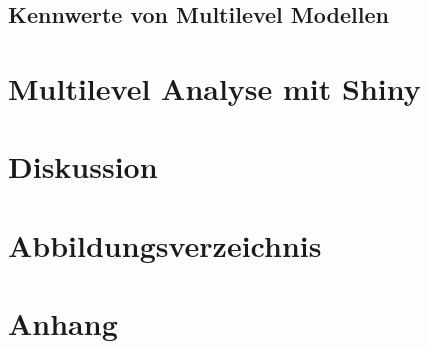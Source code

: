 \documentclass[12pt]{article}\usepackage[]{graphicx}\usepackage[]{color}
\begin{document}
\subsection{Kennwerte von Multilevel Modellen}
\section{Multilevel Analyse mit Shiny}
\section{Diskussion}
\newpage



\section{Abbildungsverzeichnis}
\section{Anhang}
\end{document}

